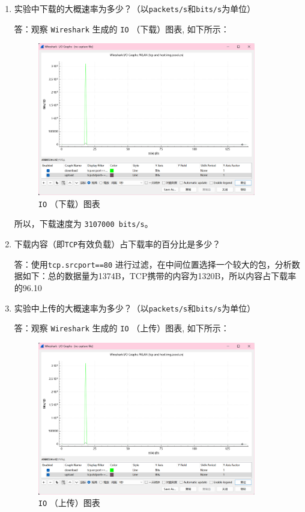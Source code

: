 \documentclass{article}
\begin{document}
\begin{enumerate}
	\item 实验中下载的大概速率为多少？（以\texttt{packets/s}和\texttt{bits/s}为单位）
	
	答：观察 \texttt{Wireshark} 生成的 \texttt{IO} （下载）图表, 如下所示：
	
	\begin{figure}[H]
		\centering
		\includegraphics[width=0.9\textwidth]{img/10.png}
		\caption{\texttt{IO} （下载）图表}
	\end{figure}
	
	所以，下载速度为 \texttt{3107000 \texttt{bits/s}}。
	
	\item 下载内容（即\texttt{TCP}有效负载）占下载率的百分比是多少？
	
	答：使用\texttt{tcp.srcport==80} 进行过滤，在中间位置选择一个较大的包，分析数据如下：总的数据量为1374B，TCP携带的内容为1320B，所以内容占下载率的96.10%
	
	\item 实验中上传的大概速率为多少？（以\texttt{packets/s}和\texttt{bits/s}为单位）
	
	答：观察 \texttt{Wireshark} 生成的 \texttt{IO} （上传）图表, 如下所示：
	
	\begin{figure}[H]
		\centering
		\includegraphics[width=0.9\textwidth]{img/10.png}
		\caption{\texttt{IO} （上传）图表}
	\end{figure}
	

\end{enumerate}
\end{document}
